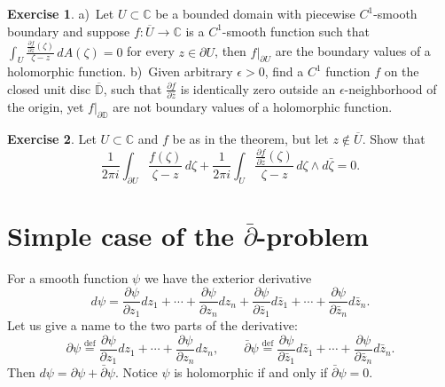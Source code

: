\documentclass[12pt,openany]{book}
\newcommand{\C}{{\mathbb{C}}}
\newcommand{\D}{{\mathbb{D}}}
\theoremstyle{plain}
\theoremstyle{remark}
\theoremstyle{definition}
\newenvironment{exbox}{%
    \def\FrameCommand{\vrule width 1pt \relax\hspace {10pt}}%
    \MakeFramed {\advance \hsize -\width \FrameRestore }%
}{%
    \endMakeFramed
}
\theoremstyle{exercise}
\newtheorem{exercise}{Exercise}[section]
\theoremstyle{example}
\begin{document}
\begin{exbox}
\begin{exercise}
a)~Let $U \subset \C$ be a bounded domain with piecewise $C^1$-smooth boundary and
suppose $f \colon \overline{U} \to \C$ is a $C^1$-smooth function such
that 
$\int_{U} \frac{\frac{\partial f}{\partial \bar{z}}(\zeta)}{\zeta-z} \,
dA(\zeta) =
0$ for every $z \in \partial U$, then $f|_{\partial U}$ are the boundary
values of a holomorphic function.
b)~Given arbitrary $\epsilon > 0$, find a $C^1$ function $f$ on the closed unit disc
$\overline{\D}$,
such that $\frac{\partial f}{\partial \bar{z}}$ is identically zero
outside an $\epsilon$-neighborhood of the origin, yet $f|_{\partial \D}$
are not boundary values of a holomorphic function.
\end{exercise}

\begin{exercise}
Let $U \subset \C$ and $f$ be as in the theorem, but let $z \notin
\overline{U}$.  Show that
\begin{equation*}
\frac{1}{2\pi i}
\int_{\partial U}
\frac{f(\zeta)}{\zeta-z}
\,
d \zeta
+
\frac{1}{2\pi i}
\int_{U}
\frac{\frac{\partial f}{\partial \bar{z}}(\zeta)}{\zeta-z}
\,
d\zeta \wedge d\bar{\zeta} 
= 0 .
\end{equation*}
\end{exercise}
\end{exbox}


\section{Simple case of the \texorpdfstring{$\bar{\partial}$}{dbar}-problem}

For a smooth function $\psi$ we have the exterior derivative
%
\begin{equation*}
d \psi =
\frac{\partial \psi}{\partial z_1} dz_1 + \cdots +
\frac{\partial \psi}{\partial z_n} dz_n
+
\frac{\partial \psi}{\partial \bar{z}_1} d\bar{z}_1 + \cdots +
\frac{\partial \psi}{\partial \bar{z}_n} d\bar{z}_n .
\end{equation*}
Let us give a name to the two parts of the derivative:
%
%
\begin{equation*}
\partial \psi \overset{\text{def}}{=}
\frac{\partial \psi}{\partial z_1} dz_1 + \cdots +
\frac{\partial \psi}{\partial z_n} dz_n, \qquad
\bar{\partial} \psi \overset{\text{def}}{=}
\frac{\partial \psi}{\partial \bar{z}_1} d\bar{z}_1 + \cdots +
\frac{\partial \psi}{\partial \bar{z}_n} d\bar{z}_n .
\end{equation*}
Then $d \psi = \partial \psi + \bar{\partial} \psi$.
Notice $\psi$ is holomorphic if and only if $\bar{\partial} \psi = 0$.
\end{document}
